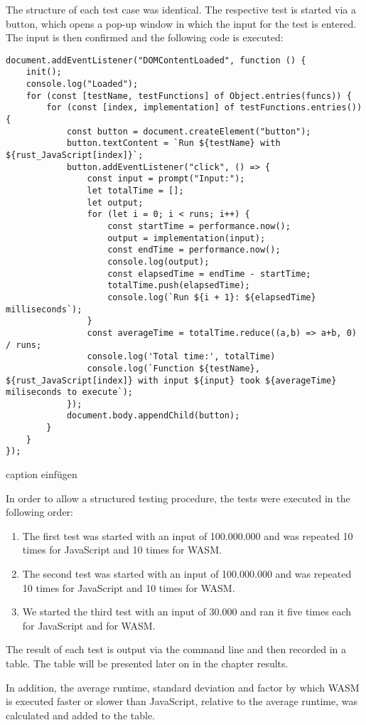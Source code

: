 The structure of each test case was identical. The respective test is started via a button, which opens a pop-up window in which the input for the test is entered. The input is then confirmed and the following code is executed:
\begin{verbatim}
document.addEventListener("DOMContentLoaded", function () {
    init();
    console.log("Loaded");
    for (const [testName, testFunctions] of Object.entries(funcs)) {
        for (const [index, implementation] of testFunctions.entries()) {
            const button = document.createElement("button");
            button.textContent = `Run ${testName} with ${rust_JavaScript[index]}`;
            button.addEventListener("click", () => {
                const input = prompt("Input:");
                let totalTime = [];
                let output;
                for (let i = 0; i < runs; i++) {
                    const startTime = performance.now();
                    output = implementation(input);
                    const endTime = performance.now();
                    console.log(output);
                    const elapsedTime = endTime - startTime;
                    totalTime.push(elapsedTime);
                    console.log(`Run ${i + 1}: ${elapsedTime} milliseconds`);
                }
                const averageTime = totalTime.reduce((a,b) => a+b, 0) / runs;
                console.log('Total time:', totalTime)
                console.log(`Function ${testName}, ${rust_JavaScript[index]} with input ${input} took ${averageTime} miliseconds to execute`);
            });
            document.body.appendChild(button);
        }
    }
});
\end{verbatim}
caption einfügen

In order to allow a structured testing procedure, the tests were executed in the following order:
\begin{enumerate}
\item The first test was started with an input of 100.000.000 and was repeated 10 times for JavaScript and 10 times for WASM.
\item The second test was started with an input of 100.000.000 and was repeated 10 times for JavaScript and 10 times for WASM.
\item We started the third test with an input of 30.000 and ran it five times each for JavaScript and for WASM.
\end{enumerate}
The result of each test is output via the command line and then recorded in a table. The table will be presented later on in the chapter results.

In addition, the average runtime, standard deviation and factor by which WASM is executed faster or slower than JavaScript, relative to the average runtime, was calculated and added to the table.